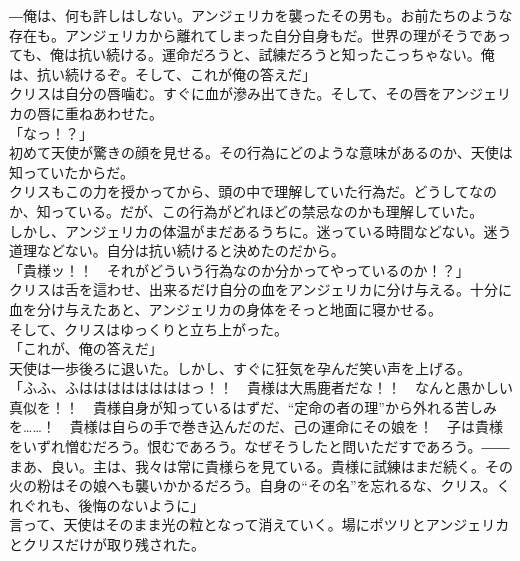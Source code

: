 \documentclass[b5j,10pt,openany]{jsbook}
\begin{document}
―俺は、何も許しはしない。アンジェリカを襲ったその男も。お前たちのような存在も。アンジェリカから離れてしまった自分自身もだ。世界の理がそうであっても、俺は抗い続ける。運命だろうと、試練だろうと知ったこっちゃない。俺は、抗い続けるぞ。そして、これが俺の答えだ」\\クリスは自分の唇噛む。すぐに血が滲み出てきた。そして、その唇をアンジェリカの唇に重ねあわせた。\\「なっ！？」\\初めて天使が驚きの顔を見せる。その行為にどのような意味があるのか、天使は知っていたからだ。\\クリスもこの力を授かってから、頭の中で理解していた行為だ。どうしてなのか、知っている。だが、この行為がどれほどの禁忌なのかも理解していた。\\しかし、アンジェリカの体温がまだあるうちに。迷っている時間などない。迷う道理などない。自分は抗い続けると決めたのだから。\\「貴様ッ！！　それがどういう行為なのか分かってやっているのか！？」\\クリスは舌を這わせ、出来るだけ自分の血をアンジェリカに分け与える。十分に血を分け与えたあと、アンジェリカの身体をそっと地面に寝かせる。\\そして、クリスはゆっくりと立ち上がった。\\「これが、俺の答えだ」\\天使は一歩後ろに退いた。しかし、すぐに狂気を孕んだ笑い声を上げる。\\「ふふ、ふははははははははっ！！　貴様は大馬鹿者だな！！　なんと愚かしい真似を！！　貴様自身が知っているはずだ、``定命の者の理''から外れる苦しみを\ldots{}\ldots{}！　貴様は自らの手で巻き込んだのだ、己の運命にその娘を！　子は貴様をいずれ憎むだろう。恨むであろう。なぜそうしたと問いただすであろう。――まあ、良い。主は、我々は常に貴様らを見ている。貴様に試練はまだ続く。その火の粉はその娘へも襲いかかるだろう。自身の``その名''を忘れるな、クリス。くれぐれも、後悔のないように」\\言って、天使はそのまま光の粒となって消えていく。場にポツリとアンジェリカとクリスだけが取り残された。
\end{document}
